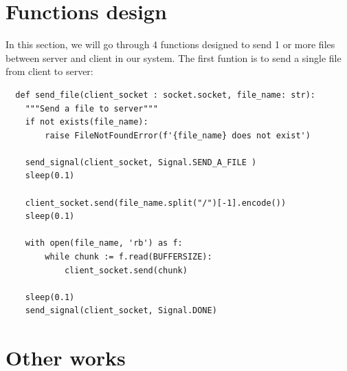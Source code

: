 \documentclass{article}
\begin{document}
\section*{Functions design}\label{functions}
In this section, we will go through 4 functions designed to send 1 or more files between server and client in our system. 
The first funtion is to send a single file from client to server: \pagebreak
\begin{lstlisting}
  def send_file(client_socket : socket.socket, file_name: str):
    """Send a file to server"""
    if not exists(file_name):
        raise FileNotFoundError(f'{file_name} does not exist')
    
    send_signal(client_socket, Signal.SEND_A_FILE )
    sleep(0.1)
    
    client_socket.send(file_name.split("/")[-1].encode())
    sleep(0.1)

    with open(file_name, 'rb') as f:
        while chunk := f.read(BUFFERSIZE):
            client_socket.send(chunk)

    sleep(0.1)
    send_signal(client_socket, Signal.DONE)
\end{lstlisting}

\section*{Other works}
\lipsum[4-4]
\end{document}
